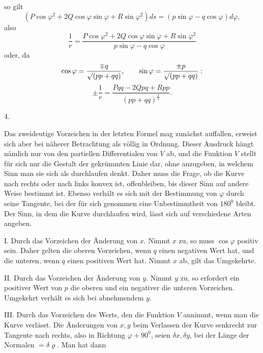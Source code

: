 %
\noindent so gilt
\[
(P\cos\varphi^2+2Q\cos\varphi\sin\varphi+R\sin\varphi^2)ds=(p\sin\varphi-q\cos\varphi)d\varphi,
\]
also
\[
\frac1r=\frac{P\cos\varphi^2+2Q\cos\varphi\sin\varphi+R\sin\varphi^2}{p\sin\varphi-q\cos\varphi}
\]
oder, da
\[
\cos\varphi=\frac{\mp q}{\mathord{\surd}(pp+qq)},\qquad\sin\varphi=\frac{\pm p}{\mathord{\surd}(pp+qq)}:
\]
\[
\pm\frac1r=\frac{Pqq-2Qpq+Rpp}{(pp+qq)^{\frac32}}.
\]

\begin{center}4.\end{center}
\noindent\hspace*{1.2em}Das zweideutige Vorzeichen in der letzten Formel mag zunächst auffallen, erweist sich aber bei näherer Betrachtung als völlig in Ordnung. Dieser Ausdruck hängt nämlich nur von den partiellen Differentialen von $V$ ab, und die Funktion $V$ stellt für sich nur die Gestalt der gekrümmten Linie dar, ohne anzugeben, in welchem Sinn man sie sich als durchlaufen denkt. Daher muss die Frage, ob die Kurve nach rechts oder nach links konvex ist, offenbleiben, bis dieser Sinn auf andere Weise bestimmt ist. Ebenso verhält es sich mit der Bestimmung von $\varphi$ durch seine Tangente, bei der für sich genommen eine Unbestimmtheit von $180^{0}$ bleibt. Der Sinn, in dem die Kurve durchlaufen wird, lässt sich auf verschiedene Arten angeben.

I. Durch das Vorzeichen der Änderung von $x$. Nimmt $x$ zu, so muss $\cos\varphi$ positiv sein. Daher gelten die oberen Vorzeichen, wenn $q$ einen negativen Wert hat, und die unteren, wenn $q$ einen positiven Wert hat. Nimmt $x$ ab, gilt das Umgekehrte.

II. Durch das Vorzeichen der Änderung von $y$. Nimmt $y$ zu, so erfordert ein positiver Wert von $p$ die oberen und ein negativer die unteren Vorzeichen. Umgekehrt verhält es sich bei abnehmendem $y$.

III. Durch das Vorzeichen des Werts, den die Funktion $V$ annimmt, wenn man die Kurve verlässt. Die Änderungen von $x,y$ beim Verlassen der Kurve senkrecht zur Tangente nach rechts, also in Richtung $\varphi+90^{0}$, seien $\delta x,\delta y$, bei der Länge der Normalen $=\delta\varrho$. Man hat dann\space%
